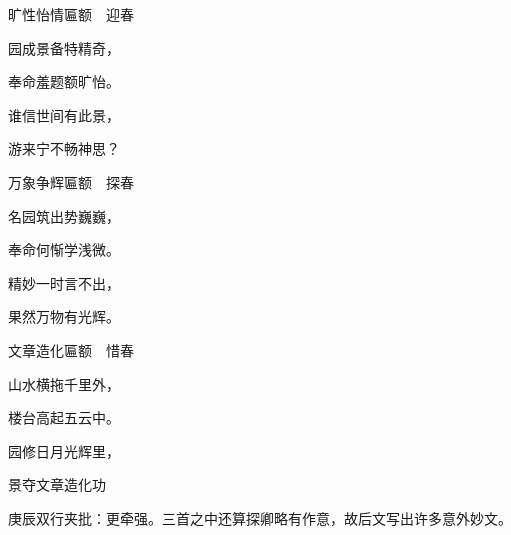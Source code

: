 \begin{poem}
    \begin{pl}旷性怡情匾额　迎春 \end{pl}

    \begin{pl}园成景备特精奇， \end{pl}

    \begin{pl}奉命羞题额旷怡。 \end{pl}

    \begin{pl}谁信世间有此景， \end{pl}

    \begin{pl}游来宁不畅神思？ \end{pl}
\end{poem}
\begin{poem}
    \begin{pl}万象争辉匾额　探春 \end{pl}

    \begin{pl}名园筑出势巍巍， \end{pl}

    \begin{pl}奉命何惭学浅微。 \end{pl}

    \begin{pl}精妙一时言不出， \end{pl}

    \begin{pl}果然万物有光辉。 \end{pl}
\end{poem}
\begin{poem}
    \begin{pl}文章造化匾额　惜春 \end{pl}

    \begin{pl}山水横拖千里外， \end{pl}

    \begin{pl}楼台高起五云中。 \end{pl}

    \begin{pl}园修日月光辉里， \end{pl}

    \begin{pl}景夺文章造化功 \end{pl}
    \begin{note}庚辰双行夹批：更牵强。三首之中还算探卿略有作意，故后文写出许多意外妙文。\end{note}
\end{poem}
